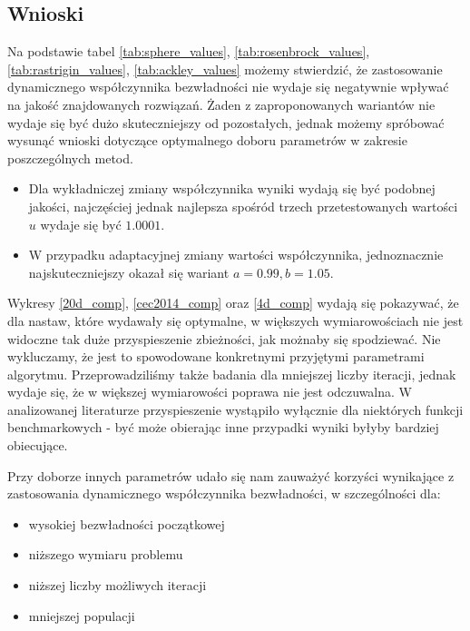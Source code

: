 \documentclass[12pt]{article}
\begin{document}
\subsection*{Wnioski}
Na podstawie tabel \ref{tab:sphere_values}, \ref{tab:rosenbrock_values}, \ref{tab:rastrigin_values}, \ref{tab:ackley_values} możemy stwierdzić, że
zastosowanie dynamicznego współczynnika bezwładności nie wydaje się negatywnie wpływać na jakość znajdowanych rozwiązań. Żaden z zaproponowanych wariantów
nie wydaje się być dużo skuteczniejszy od pozostałych, jednak możemy spróbować wysunąć wnioski dotyczące optymalnego doboru parametrów w zakresie poszczególnych metod.
\begin{itemize}
	\item Dla wykładniczej zmiany współczynnika wyniki wydają się być podobnej jakości, najczęściej jednak najlepsza spośród trzech przetestowanych wartości $u$ wydaje się być $1.0001$.
	\item W przypadku adaptacyjnej zmiany wartości współczynnika, jednoznacznie najskuteczniejszy okazał się wariant $a = 0.99, b = 1.05$.
\end{itemize}

Wykresy \ref{20d_comp}, \ref{cec2014_comp} oraz \ref{4d_comp} wydają się pokazywać, że dla nastaw, które wydawały się optymalne, w większych wymiarowościach nie jest widoczne tak duże
przyspieszenie zbieżności, jak możnaby się spodziewać. Nie wykluczamy, że jest to spowodowane konkretnymi przyjętymi parametrami algorytmu. Przeprowadziliśmy
także badania dla mniejszej liczby iteracji, jednak wydaje się, że w większej wymiarowości poprawa nie jest odczuwalna. W analizowanej literaturze przyspieszenie
wystąpiło wyłącznie dla niektórych funkcji benchmarkowych - być może obierając inne przypadki wyniki byłyby bardziej obiecujące.

Przy doborze innych parametrów udało się nam zauważyć korzyści wynikające z zastosowania dynamicznego współczynnika bezwładności, w szczególności dla:
\begin{itemize}
	\item wysokiej bezwładności początkowej
	\item niższego wymiaru problemu
	\item niższej liczby możliwych iteracji
	\item mniejszej populacji
\end{itemize}
\end{document}
